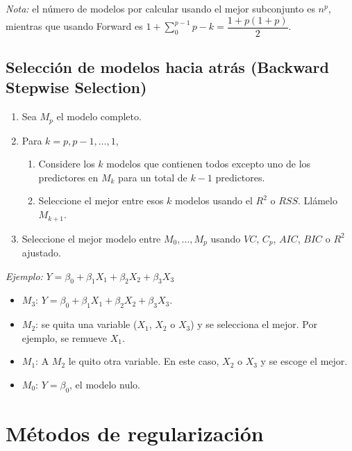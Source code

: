 \documentclass[
  12pt,
]{book}
\providecommand{\tightlist}{%
  \setlength{\itemsep}{0pt}\setlength{\parskip}{0pt}}
\theoremstyle{definition}
\theoremstyle{definition}
\theoremstyle{definition}
\theoremstyle{remark}
\begin{document}
\emph{Nota:} el número de modelos por calcular usando el mejor subconjunto es \(n^p\), mientras que usando Forward es \(1+\displaystyle\sum_0^ {p-1} p-k = \dfrac{1+p(1+p)}2\).

\hypertarget{selecciuxf3n-de-modelos-hacia-atruxe1s-backward-stepwise-selection}{%
\subsection{\texorpdfstring{Selección de modelos hacia atrás (\textbf{Backward Stepwise Selection})}{Selección de modelos hacia atrás (Backward Stepwise Selection)}}\label{selecciuxf3n-de-modelos-hacia-atruxe1s-backward-stepwise-selection}}

\begin{enumerate}
\def\labelenumi{\arabic{enumi}.}
\tightlist
\item
  Sea \(M_p\) el modelo completo.
\item
  Para \(k=p,p-1,\dots,1\),

  \begin{enumerate}
  \def\labelenumii{\alph{enumii}.}
  \tightlist
  \item
    Considere los \(k\) modelos que contienen todos excepto uno de los predictores en \(M_k\) para un total de \(k-1\) predictores.
  \item
    Seleccione el mejor entre esos \(k\) modelos usando el \(R^2\) o \(RSS\). Llámelo \(M_{k+1}\).
  \end{enumerate}
\item
  Seleccione el mejor modelo entre \(M_0,\dots,M_p\) usando \(VC\), \(C_p\), \(AIC\), \(BIC\) o \(R^2\) ajustado.
\end{enumerate}

\emph{Ejemplo:} \(Y=\beta_0+\beta_1X_1+\beta_2X_2+\beta_3X_3\)

\begin{itemize}
\item
  \(M_3\): \(Y = \beta_0 +\beta_1X_1+\beta_2X_2+\beta_3X_3\).
\item
  \(M_2\): se quita una variable (\(X_1\), \(X_2\) o \(X_3\)) y se selecciona el mejor. Por ejemplo, se remueve \(X_1\).
\item
  \(M_1\): A \(M_{2}\) le quito otra variable. En este caso, \(X_2\) o \(X_3\) y se escoge el mejor.
\item
  \(M_0\): \(Y=\beta_0\), el modelo nulo.
\end{itemize}

\hypertarget{muxe9todos-de-regularizaciuxf3n}{%
\section{Métodos de regularización}\label{muxe9todos-de-regularizaciuxf3n}}
\end{document}
